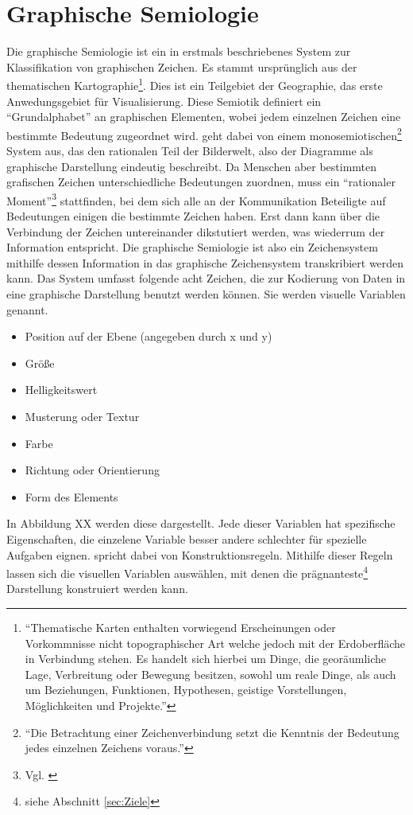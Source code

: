 \documentclass[a4paper, 12pt, DIVcalc, onepage, pdftex, headsepline, footsepline]{scrreprt}
\begin{document}
\section{Graphische Semiologie}
\label{sec:graphischeSemiologie}
Die graphische Semiologie ist ein in \cite{Bertin} erstmals beschriebenes System zur Klassifikation von graphischen Zeichen.
Es stammt ursprünglich aus der thematischen Kartographie\footnote{"`Thematische Karten enthalten vorwiegend
Erscheinungen oder Vorkommnisse nicht topographischer Art welche jedoch mit der Erdoberfläche in Verbindung
stehen. Es handelt sich hierbei um Dinge, die georäumliche Lage, Verbreitung oder Bewegung besitzen, sowohl
um reale Dinge, als auch um Beziehungen, Funktionen, Hypothesen, geistige Vorstellungen, Möglichkeiten und
Projekte."'\citep{Gitta} }. Dies ist ein Teilgebiet der Geographie, das erste Anwedungsgebiet für
Visualisierung.
Diese Semiotik definiert ein "`Grundalphabet"' an graphischen Elementen, wobei
jedem einzelnen Zeichen eine bestimmte Bedeutung zugeordnet wird. \citep{Bertin} geht dabei von einem
monosemiotischen\footnote{"`Die Betrachtung einer Zeichenverbindung setzt die Kenntnis der Bedeutung jedes
einzelnen Zeichens voraus."'\citep[S.\,3]{Bertin}} System aus, das den rationalen Teil der Bilderwelt, also der Diagramme
als graphische Darstellung eindeutig beschreibt.
Da Menschen aber bestimmten grafischen Zeichen unterschiedliche Bedeutungen zuordnen, muss ein "`rationaler Moment"'\footnote{Vgl.
\citep{Bertin}} stattfinden, bei dem sich alle an der Kommunikation Beteiligte auf Bedeutungen einigen
die bestimmte Zeichen haben. Erst dann kann über die Verbindung der Zeichen untereinander dikstutiert
werden, was wiederrum der Information entspricht.
Die graphische Semiologie ist also ein Zeichensystem mithilfe dessen Information in das graphische Zeichensystem
transkribiert werden kann.
Das System umfasst folgende acht Zeichen, die zur Kodierung von Daten in eine graphische Darstellung benutzt
werden können. Sie werden visuelle Variablen genannt.
\begin{itemize}
\item Position auf der Ebene (angegeben durch x und y)
\item Größe
\item Helligkeitswert
\item Musterung oder Textur
\item Farbe
\item Richtung oder Orientierung
\item Form des Elements
\end{itemize}
In Abbildung XX werden diese dargestellt.
Jede dieser Variablen hat spezifische Eigenschaften, die einzelene Variable besser andere schlechter
für spezielle Aufgaben eignen. \citep{Bertin} spricht dabei von Konstruktionsregeln.
Mithilfe dieser Regeln lassen sich die visuellen Variablen auswählen, mit denen die
prägnanteste\footnote{siehe Abschnitt \ref{sec:Ziele}} Darstellung konstruiert werden kann.
\end{document}
